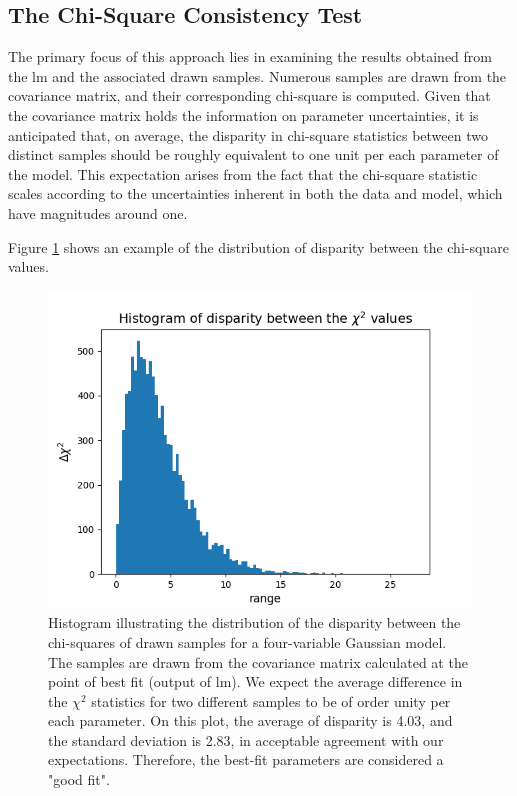 \documentclass[12pt, TexShade, letterpaper]{report}
\begin{document}
\subsection{The Chi-Square Consistency Test}
\label{chap:method,sub:test,subsub:chi}
The primary focus of this approach lies in examining the results obtained from the \gls{lm} and the associated drawn samples. Numerous samples are drawn from the covariance matrix, and their corresponding chi-square is computed. Given that the covariance matrix holds the information on parameter uncertainties, it is anticipated that, on average, the disparity in chi-square statistics between two distinct samples should be roughly equivalent to one unit per each parameter of the model. This expectation arises from the fact that the chi-square statistic scales according to the uncertainties inherent in both the data and model, which have magnitudes around one.\par
Figure \ref{fig:csq_test} shows an example of the distribution of disparity between the chi-square values.\par
\begin{figure}[h!]
\centering
\includegraphics[scale =0.8]{csq_hist.png}
\caption[Histogram of disparity in the chi-square values of drawn samples]{Histogram illustrating the distribution of the disparity between the chi-squares of drawn samples for a four-variable Gaussian model. The samples are drawn from the covariance matrix calculated at the point of best fit (output of \gls{lm}). We expect the average difference in the $\chi^2$ statistics for two different samples to be of order unity per each parameter.
On this plot, the average of disparity is 4.03, and the standard deviation is 2.83, in acceptable agreement with our expectations. Therefore, the best-fit parameters are considered a "good fit".}
\label{fig:csq_test}
\end{figure}
\end{document}
